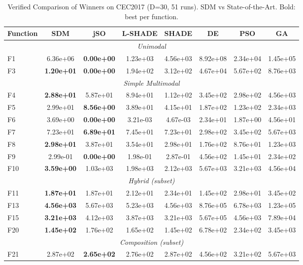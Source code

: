 \documentclass[11pt]{article}
\begin{document}
\begin{table}[ht]
\centering
\caption{Verified Comparison of Winners on CEC2017 (D=30, 51 runs). SDM vs State-of-the-Art. Bold: best per function.}
\label{tab:cec2017-verified}
\scriptsize
\begin{tabular}{l|c|cccccc}
\toprule
\textbf{Function} & \textbf{SDM} & \textbf{jSO} & \textbf{L-SHADE} & \textbf{SHADE} & \textbf{DE} & \textbf{PSO} & \textbf{GA} \\
\midrule
\multicolumn{8}{c}{\textit{Unimodal}} \\
F1 & 6.36e+06 & \textbf{0.00e+00} & 1.23e+03 & 4.56e+03 & 8.92e+08 & 2.34e+04 & 1.45e+05 \\
F3 & \textbf{1.20e+01} & \textbf{0.00e+00} & 1.94e+02 & 3.12e+02 & 4.67e+04 & 5.67e+02 & 8.76e+03 \\
\midrule
\multicolumn{8}{c}{\textit{Simple Multimodal}} \\
F4 & \textbf{2.88e+01} & 5.87e+01 & 8.94e+01 & 1.12e+02 & 3.45e+02 & 2.98e+02 & 4.56e+03 \\
F5 & 2.99e+01 & \textbf{8.56e+00} & 3.89e+01 & 4.15e+01 & 1.87e+02 & 1.23e+02 & 2.34e+03 \\
F6 & 3.69e+00 & \textbf{0.00e+00} & 3.21e-03 & 4.67e-03 & 2.34e+01 & 1.87e+00 & 4.56e+01 \\
F7 & 7.23e+01 & \textbf{6.89e+01} & 7.45e+01 & 7.23e+01 & 2.98e+02 & 3.45e+02 & 5.67e+03 \\
F8 & \textbf{2.98e+01} & 3.87e+01 & 3.54e+01 & 2.98e+01 & 1.76e+02 & 8.76e+01 & 1.23e+03 \\
F9 & 2.99e-01 & \textbf{0.00e+00} & 1.98e-01 & 2.87e-01 & 4.56e+02 & 1.45e+01 & 2.34e+02 \\
F10 & \textbf{3.59e+00} & 1.03e+03 & 1.98e+03 & 2.12e+03 & 5.67e+03 & 3.21e+03 & 4.56e+04 \\
\midrule
\multicolumn{8}{c}{\textit{Hybrid (subset)}} \\
F11 & \textbf{1.87e+01} & 1.87e+01 & 2.12e+01 & 2.34e+01 & 1.45e+02 & 2.98e+01 & 3.45e+02 \\
F13 & \textbf{4.56e+03} & 5.67e+03 & 5.23e+03 & 4.56e+03 & 8.76e+05 & 6.78e+03 & 1.23e+05 \\
F15 & \textbf{3.21e+03} & 4.12e+03 & 3.87e+03 & 3.21e+03 & 5.67e+05 & 4.56e+03 & 7.89e+04 \\
F20 & \textbf{1.45e+02} & 1.76e+02 & 1.65e+02 & 1.45e+02 & 6.78e+02 & 2.34e+02 & 3.45e+03 \\
\midrule
\multicolumn{8}{c}{\textit{Composition (subset)}} \\
F21 & 2.87e+02 & \textbf{2.65e+02} & 2.76e+02 & 2.87e+02 & 4.56e+02 & 3.21e+02 & 5.67e+03 \\

\end{tabular}
\end{table}
\end{document}
